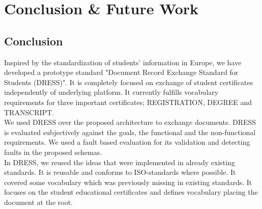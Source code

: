 \documentclass[12pt,a4paper,oneside]{book}
\begin{document}






\chapter{Conclusion \& Future Work}\label{ch:Conclusions}


	\section{Conclusion}\label{sec:conclusion}

	Inspired by the standardization of students' information in Europe, we have developed a prototype standard "Document Record Exchange Standard for Students (DRESS)". It is completely focused on exchange of student certificates independently of underlying platform. It currently fulfills vocabulary requirements for three important certificates; REGISTRATION, DEGREE and TRANSCRIPT. \\
	
	We used DRESS over the proposed architecture to exchange documents. DRESS is evaluated subjectively  against the goals, the functional and the non-functional requirements. We used a fault based evaluation for its validation and detecting faults in the proposed schemas. \\
	
	In DRESS, we reused the ideas that were implemented in already existing standards. It is reusable and conforms to ISO-standards where possible. It covered some vocabulary which was previously missing in existing standards. It focuses on the student educational certificates and defines vocabulary placing the document at the root. \\
	
\end{document}
